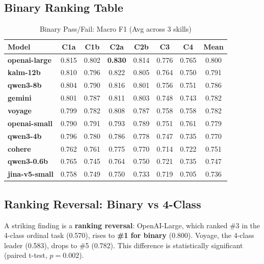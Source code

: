 \documentclass[11pt]{article}
\begin{document}
\subsection{Binary Ranking Table}

\begin{table}[htbp]
\centering
\caption{Binary Pass/Fail: Macro F1 (Avg across 3 skills)}
\begin{tabular}{lccccccc}
\toprule
\textbf{Model} & \textbf{C1a} & \textbf{C1b} & \textbf{C2a} & \textbf{C2b} & \textbf{C3} & \textbf{C4} & \textbf{Mean} \\
\midrule
\textbf{openai-large} & 0.815 & 0.802 & \textbf{0.830} & 0.814 & 0.776 & 0.765 & 0.800 \\
\textbf{kalm-12b} & 0.810 & 0.796 & 0.822 & 0.805 & 0.764 & 0.750 & 0.791 \\
\textbf{qwen3-8b} & 0.804 & 0.790 & 0.816 & 0.801 & 0.756 & 0.751 & 0.786 \\
\textbf{gemini} & 0.801 & 0.787 & 0.811 & 0.803 & 0.748 & 0.743 & 0.782 \\
\textbf{voyage} & 0.799 & 0.782 & 0.808 & 0.787 & 0.758 & 0.758 & 0.782 \\
\textbf{openai-small} & 0.790 & 0.791 & 0.793 & 0.789 & 0.751 & 0.761 & 0.779 \\
\textbf{qwen3-4b} & 0.796 & 0.780 & 0.786 & 0.778 & 0.747 & 0.735 & 0.770 \\
\textbf{cohere} & 0.762 & 0.761 & 0.775 & 0.770 & 0.714 & 0.722 & 0.751 \\
\textbf{qwen3-0.6b} & 0.765 & 0.745 & 0.764 & 0.750 & 0.721 & 0.735 & 0.747 \\
\textbf{jina-v5-small} & 0.758 & 0.749 & 0.750 & 0.733 & 0.719 & 0.705 & 0.736 \\
\bottomrule
\end{tabular}
\end{table}

\subsection{Ranking Reversal: Binary vs 4-Class}

A striking finding is a \textbf{ranking reversal}: OpenAI-Large, which ranked \#3 in the 4-class ordinal task (0.570), rises to \textbf{\#1 for binary} (0.800). Voyage, the 4-class leader (0.583), drops to \#5 (0.782). This difference is statistically significant (paired t-test, $p = 0.002$).
\end{document}

